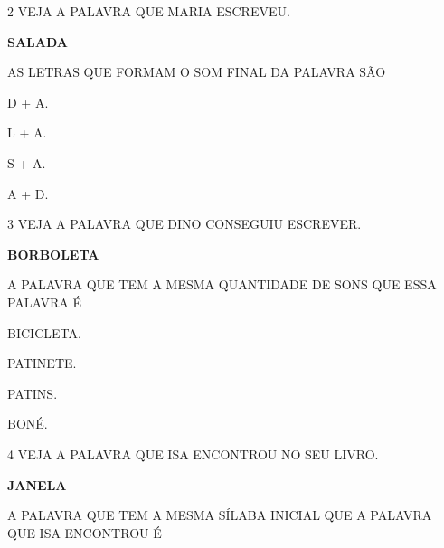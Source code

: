 
\pagebreak

\num{2} VEJA A PALAVRA QUE MARIA ESCREVEU.

\begin{myquote}
\centering\Large\textbf{SALADA}
\end{myquote}

AS LETRAS QUE FORMAM O SOM FINAL DA PALAVRA SÃO

\begin{multicols}{2}
\begin{escolha}
\item D + A.

\item L + A.

\item S + A.

\item A + D.
\end{escolha}
\end{multicols}

\num{3} VEJA A PALAVRA QUE DINO CONSEGUIU ESCREVER.

\begin{myquote}
\centering\Large\textbf{BORBOLETA}
\end{myquote}

A PALAVRA QUE TEM A MESMA QUANTIDADE DE SONS QUE ESSA PALAVRA É 

\begin{multicols}{2}
\begin{escolha}%
\item BICICLETA.

\item PATINETE.

\item PATINS.

\item BONÉ.
\end{escolha}
\end{multicols}

\num{4} VEJA A PALAVRA QUE ISA ENCONTROU NO SEU LIVRO. 

\begin{myquote}
\centering\Large\textbf{JANELA}
\end{myquote}

A PALAVRA QUE TEM A MESMA SÍLABA INICIAL QUE A PALAVRA QUE ISA ENCONTROU É

